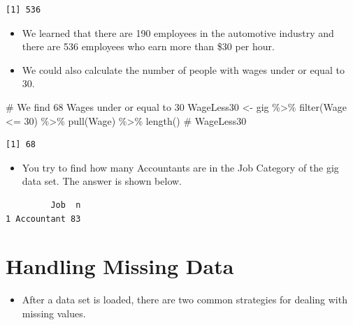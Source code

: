 \documentclass[
  letterpaper,
  DIV=11,
  numbers=noendperiod]{scrreprt}
\newenvironment{Shaded}{\begin{snugshade}}{\end{snugshade}}
\newcommand{\CommentTok}[1]{\textcolor[rgb]{0.37,0.37,0.37}{#1}}
\newcommand{\DecValTok}[1]{\textcolor[rgb]{0.68,0.00,0.00}{#1}}
\newcommand{\FunctionTok}[1]{\textcolor[rgb]{0.28,0.35,0.67}{#1}}
\newcommand{\NormalTok}[1]{\textcolor[rgb]{0.00,0.23,0.31}{#1}}
\newcommand{\OtherTok}[1]{\textcolor[rgb]{0.00,0.23,0.31}{#1}}
\newcommand{\SpecialCharTok}[1]{\textcolor[rgb]{0.37,0.37,0.37}{#1}}
\providecommand{\tightlist}{%
  \setlength{\itemsep}{0pt}\setlength{\parskip}{0pt}}\usepackage{longtable,booktabs,array}
\begin{document}
\begin{verbatim}
[1] 536
\end{verbatim}

\begin{itemize}
\item
  We learned that there are 190 employees in the automotive industry and
  there are 536 employees who earn more than \$30 per hour.
\item
  We could also calculate the number of people with wages under or equal
  to 30.
\end{itemize}

\begin{Shaded}
\begin{Highlighting}[]
\CommentTok{\# We find 68 Wages under or equal to 30}
\NormalTok{WageLess30 }\OtherTok{\textless{}{-}}\NormalTok{ gig }\SpecialCharTok{\%\textgreater{}\%}
    \FunctionTok{filter}\NormalTok{(Wage }\SpecialCharTok{\textless{}=} \DecValTok{30}\NormalTok{) }\SpecialCharTok{\%\textgreater{}\%}
    \FunctionTok{pull}\NormalTok{(Wage) }\SpecialCharTok{\%\textgreater{}\%}
    \FunctionTok{length}\NormalTok{()  }\CommentTok{\#}
\NormalTok{WageLess30}
\end{Highlighting}
\end{Shaded}

\begin{verbatim}
[1] 68
\end{verbatim}

\begin{itemize}
\tightlist
\item
  You try to find how many Accountants are in the Job Category of the
  gig data set. The answer is shown below.
\end{itemize}

\begin{verbatim}
         Job  n
1 Accountant 83
\end{verbatim}


\chapter{Handling Missing Data}\label{handling-missing-data}

\begin{itemize}
\tightlist
\item
  After a data set is loaded, there are two common strategies for
  dealing with missing values.
\end{itemize}
\end{document}
